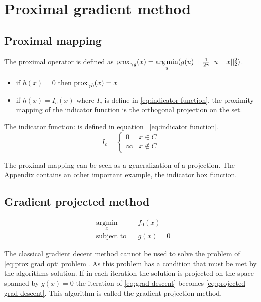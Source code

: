 \chapter{Proximal gradient method}
	\section{Proximal mapping}
		The proximal operator is defined as $\operatorname{prox}_{\gamma g}(x)= \underset{u}{\operatorname*{arg\,min}}(g(u) + \frac{1}{2 \gamma}||u-x||^2_2)$. 
		
		\begin{itemize}
			\item if $h(x)=0$ then $\operatorname{prox}_{\gamma h}(x)=x$ 
			\item if $h(x)=I_c(x)$ where $I_c$ is define in \eqref{eq:indicator function}, the proximity mapping of the indicator function is the orthogonal projection on the set.
		\end{itemize}
		
		The indicator function: is defined in equation ~\eqref{eq:indicator function}.
		\begin{equation}
			I_c = 
			\begin{cases}
			0 & x \in C  \\
			\infty & x \notin C
			\end{cases}
			\label{eq:indicator function}
		\end{equation}
		
		The proximal mapping can be seen as a generalization of a projection. The Appendix contains an other important example, the indicator box function.
	
	\section{Gradient projected method}
		
		\begin{equation}
			\begin{aligned}
			& \underset{x}{\text{argmin}}
			& & f_0(x) \\
			& \text{subject to}
			& & g(x)=0
			\end{aligned}
			\label{eq:prox grad opti problem}
		\end{equation}
		
		The classical gradient decent method cannot be used to solve the problem of \eqref{eq:prox grad opti problem}. As this problem has a condition that must be met by the algorithms solution. If in each iteration the solution is projected on the space spanned by $g(x)=0$ the iteration of \eqref{eq:grad descent} becomes \eqref{eq:projected grad descent}. This algorithm is called the gradient projection method.
		
